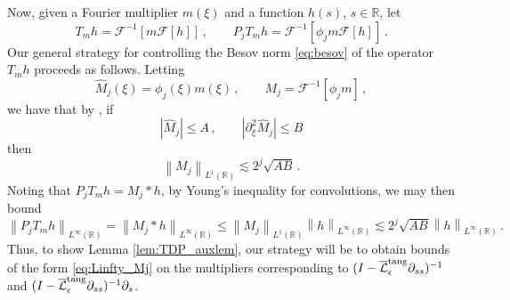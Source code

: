 \documentclass[11pt,reqno]{amsart}
\newcommand{\R}{\mathbb{R}}
\newcommand{\p}{\partial}
\newcommand{\abs}[1]{\left\lvert #1 \right\rvert}
\newcommand{\norm}[1]{\left\lVert #1 \right\rVert}
\newcommand{\wh}[1]{\widehat{#1}}
\newcommand{\mc}[1]{\mathcal{#1}}
\theoremstyle{definition}
\begin{document}
Now, given a Fourier multiplier $m(\xi)$ and a function $h(s)$, $s\in \R$, let 
\begin{equation}
T_m h = \mc{F}^{-1}[m\mc{F}[h]] \,, \qquad P_jT_m h = \mc{F}^{-1}[\phi_jm\mc{F}[h]] \,.
\end{equation}
%
Our general strategy for controlling the Besov norm \eqref{eq:besov} of the operator $T_m h$ proceeds as follows. Letting 
\begin{equation}
\wh M_j(\xi)= \phi_j(\xi)m(\xi)\,, \qquad M_j=\mc{F}^{-1}[\phi_jm]\,,
\end{equation}
we have that by \cite[Lemma 2.1]{ohm2025angle}, if 
\begin{equation}\label{eq:Linfty_Mj}
\abs{\wh M_j}\le A\,, \qquad
\abs{\p_\xi^2\wh M_j}\le B
\end{equation}
then
\begin{equation}\label{eq:L1_Mj}
\norm{M_j}_{L^1(\R)} \lesssim 2^j \sqrt{AB}\,.
\end{equation}
%
%
Noting that $P_jT_m h =M_j*h$, by Young's inequality for convolutions, we may then bound
\begin{equation}\label{eq:PjBound}
\norm{P_jT_m h}_{L^\infty(\R)}=\norm{M_j*h}_{L^\infty(\R)}\le \norm{M_j}_{L^1(\R)}\norm{h}_{L^\infty(\R)} 
\lesssim 2^j \sqrt{AB}\norm{h}_{L^\infty(\R)} \,.
\end{equation}
%
%
Thus, to show Lemma \ref{lem:TDP_auxlem}, our strategy will be to obtain bounds of the form \eqref{eq:Linfty_Mj} on the multipliers corresponding to $(I- \overline{\mc{L}}_\epsilon^{\rm tang}\p_{ss})^{-1}$ and $(I- \overline{\mc{L}}_\epsilon^{\rm tang}\p_{ss})^{-1}\p_s$.
\end{document}
